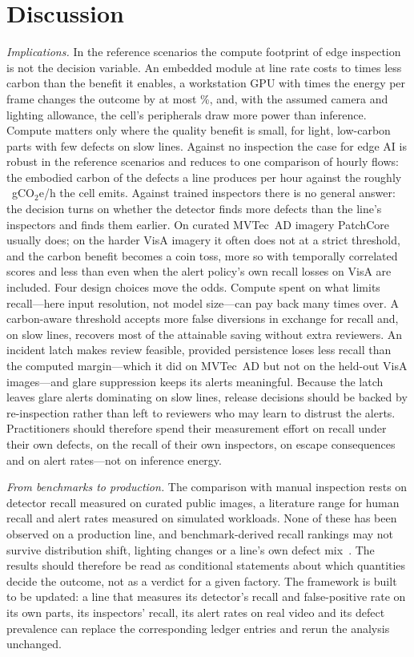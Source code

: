 \section{Discussion}
\emph{Implications.} In the reference scenarios the compute footprint of edge inspection is not the decision variable. An embedded module at line rate costs \EdgeBenefitRatioMin{} to \EdgeBenefitRatioMax{} times less carbon than the benefit it enables, a workstation GPU with \FrameEnergyRatio{} times the energy per frame changes the outcome by at most \PlatformDeltaCMax\%, and, with the assumed camera and lighting allowance, the cell's peripherals draw more power than inference. Compute matters only where the quality benefit is small, for light, low-carbon parts with few defects on slow lines. Against no inspection the case for edge AI is robust in the reference scenarios and reduces to one comparison of hourly flows: the embodied carbon of the defects a line produces per hour against the roughly \NomogramGramsPerHour~gCO$_2$e/h the cell emits. Against trained inspectors there is no general answer: the decision turns on whether the detector finds more defects than the line's inspectors and finds them earlier. On curated MVTec~AD imagery PatchCore usually does; on the harder VisA imagery it often does not at a strict threshold, and the carbon benefit becomes a coin toss, more so with temporally correlated scores and less than even when the alert policy's own recall losses on VisA are included. Four design choices move the odds. Compute spent on what limits recall---here input resolution, not model size---can pay back many times over. A carbon-aware threshold accepts more false diversions in exchange for recall and, on slow lines, recovers most of the attainable saving without extra reviewers. An incident latch makes review feasible, provided persistence loses less recall than the computed margin---which it did on MVTec~AD but not on the held-out VisA images---and glare suppression keeps its alerts meaningful. Because the latch leaves glare alerts dominating on slow lines, release decisions should be backed by re-inspection rather than left to reviewers who may learn to distrust the alerts. Practitioners should therefore spend their measurement effort on recall under their own defects, on the recall of their own inspectors, on escape consequences and on alert rates---not on inference energy.

\emph{From benchmarks to production.} The comparison with manual inspection rests on detector recall measured on curated public images, a literature range for human recall and alert rates measured on simulated workloads. None of these has been observed on a production line, and benchmark-derived recall rankings may not survive distribution shift, lighting changes or a line's own defect mix~\cite{pemula2025robust}. The results should therefore be read as conditional statements about which quantities decide the outcome, not as a verdict for a given factory. The framework is built to be updated: a line that measures its detector's recall and false-positive rate on its own parts, its inspectors' recall, its alert rates on real video and its defect prevalence can replace the corresponding ledger entries and rerun the analysis unchanged.

